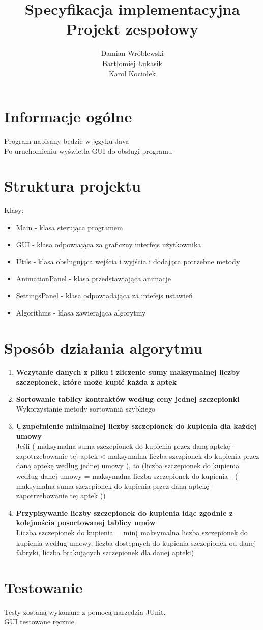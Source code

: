 \documentclass[] {article}
\title{Specyfikacja implementacyjna\\Projekt zespołowy}
\author{Damian Wróblewski\\Bartłomiej Łukasik\\Karol Kociołek}
\begin{document}
\maketitle

\section{Informacje ogólne}
Program napisany będzie w języku Java\\
Po uruchomieniu wyświetla GUI do obsługi programu

\section{Struktura projektu}
Klasy:
\begin{itemize}
	\item Main - klasa sterująca programem
	\item GUI - klasa odpowiająca za graficzny interfejs użytkownika
	\item Utils - klasa obsługująca wejścia i wyjścia i dodająca potrzebne metody
	\item AnimationPanel - klasa przedstawiająca animacje
	\item SettingsPanel - klasa odpowiadająca za intefejs ustawień
	\item Algorithms - klasa zawierająca algorytmy
\end{itemize}

\section{Sposób działania algorytmu}
\begin {enumerate}
	\item \textbf{Wczytanie danych z pliku i zliczenie sumy maksymalnej liczby szczepionek, które może kupić każda z aptek}
	\item \textbf{Sortowanie tablicy kontraktów według ceny jednej szczepionki} \\
			Wykorzystanie metody sortowania szybkiego
	\item  \textbf{Uzupełnienie minimalnej liczby szczepionek do kupienia dla każdej umowy }\\
			Jeśli ( maksymalna suma szczepionek do kupienia przez daną aptekę - zapotrzebowanie tej aptek < maksymalna liczba szczpionek do kupienia przez daną aptekę według jednej umowy ), to (liczba szczepionek do kupienia według danej umowy = maksymalna  liczba szczepionek do kupienia - ( maksymalna suma szczepionek do kupienia przez daną aptekę - zapotrzebowanie tej aptek ))
	\item \textbf{Przypisywanie liczby szczepionek do kupienia idąc zgodnie z kolejnościa posortowanej tablicy umów} \\
			Liczba szczepionek do kupienia = min( maksymalna liczba szczepionek do kupienia według umowy, liczba dostępnych do kupienia szczepionek od danej fabryki, liczba brakujących szczepionek dla danej apteki)

\end{enumerate}

\section{Testowanie}
Testy zostaną wykonane z pomocą narzędzia JUnit.\\
GUI testowane ręcznie
\end{document}
